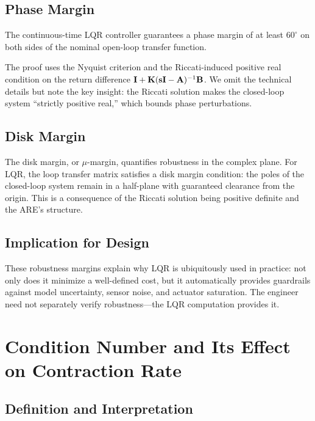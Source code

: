 \subsection{Phase Margin}

\begin{theorem}
\label{thm:ch6:phase-margin}
The continuous-time LQR controller guarantees a phase margin of at least $60^\circ$ on both sides of the nominal
open-loop transfer function.
\end{theorem}

The proof uses the Nyquist criterion and the Riccati-induced positive real condition on the return difference
$\mathbf{I} + \mathbf{K}(\mathbf{sI}-\mathbf{A})^{-1}\mathbf{B}$. We omit the technical details but note the key insight: the
Riccati solution makes the closed-loop system ``strictly positive real,'' which bounds phase perturbations.

\subsection{Disk Margin}

The disk margin, or $\mu$-margin, quantifies robustness in the complex plane. For LQR, the loop transfer matrix
satisfies a disk margin condition: the poles of the closed-loop system remain in a half-plane with guaranteed clearance
from the origin. This is a consequence of the Riccati solution being positive definite and the ARE's structure.

\subsection{Implication for Design}

These robustness margins explain why LQR is ubiquitously used in practice: not only does it minimize a well-defined cost,
but it automatically provides guardrails against model uncertainty, sensor noise, and actuator saturation. The engineer
need not separately verify robustness---the LQR computation provides it.

\section{Condition Number and Its Effect on Contraction Rate}

\subsection{Definition and Interpretation}

